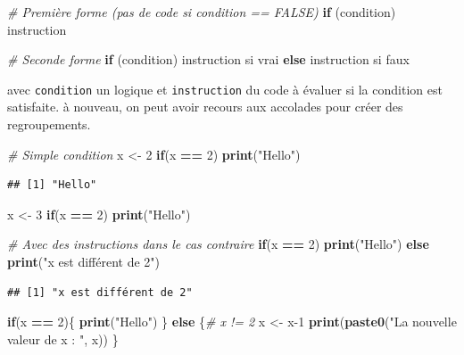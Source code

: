 \documentclass[
  11pt,
]{book}
\newenvironment{Shaded}{\begin{snugshade}}{\end{snugshade}}
\newcommand{\CommentTok}[1]{\textcolor[rgb]{0.56,0.35,0.01}{\textit{#1}}}
\newcommand{\ControlFlowTok}[1]{\textcolor[rgb]{0.13,0.29,0.53}{\textbf{#1}}}
\newcommand{\DecValTok}[1]{\textcolor[rgb]{0.00,0.00,0.81}{#1}}
\newcommand{\KeywordTok}[1]{\textcolor[rgb]{0.13,0.29,0.53}{\textbf{#1}}}
\newcommand{\NormalTok}[1]{#1}
\newcommand{\OperatorTok}[1]{\textcolor[rgb]{0.81,0.36,0.00}{\textbf{#1}}}
\newcommand{\StringTok}[1]{\textcolor[rgb]{0.31,0.60,0.02}{#1}}
\numberwithin{equation}{section}
\numberwithin{countremarque}{section}
\begin{document}
\begin{Shaded}
\begin{Highlighting}[]
\CommentTok{\# Première forme (pas de code si condition == FALSE)}
\ControlFlowTok{if}\NormalTok{ (condition) instruction}

\CommentTok{\# Seconde forme}
\ControlFlowTok{if}\NormalTok{ (condition) instruction si vrai }\ControlFlowTok{else}\NormalTok{ instruction si faux}
\end{Highlighting}
\end{Shaded}

avec \texttt{condition} un logique et \texttt{instruction} du code à évaluer si la condition est satisfaite. à nouveau, on peut avoir recours aux accolades pour créer des regroupements.

\begin{Shaded}
\begin{Highlighting}[]
\CommentTok{\# Simple condition}
\NormalTok{x \textless{}{-}}\StringTok{ }\DecValTok{2}
\ControlFlowTok{if}\NormalTok{(x }\OperatorTok{==}\StringTok{ }\DecValTok{2}\NormalTok{) }\KeywordTok{print}\NormalTok{(}\StringTok{"Hello"}\NormalTok{)}
\end{Highlighting}
\end{Shaded}

\begin{lstlisting}
## [1] "Hello"
\end{lstlisting}

\begin{Shaded}
\begin{Highlighting}[]
\NormalTok{x \textless{}{-}}\StringTok{ }\DecValTok{3}
\ControlFlowTok{if}\NormalTok{(x }\OperatorTok{==}\StringTok{ }\DecValTok{2}\NormalTok{) }\KeywordTok{print}\NormalTok{(}\StringTok{"Hello"}\NormalTok{)}

\CommentTok{\# Avec des instructions dans le cas contraire}
\ControlFlowTok{if}\NormalTok{(x }\OperatorTok{==}\StringTok{ }\DecValTok{2}\NormalTok{) }\KeywordTok{print}\NormalTok{(}\StringTok{"Hello"}\NormalTok{) }\ControlFlowTok{else} \KeywordTok{print}\NormalTok{(}\StringTok{"x est différent de 2"}\NormalTok{)}
\end{Highlighting}
\end{Shaded}

\begin{lstlisting}
## [1] "x est différent de 2"
\end{lstlisting}

\begin{Shaded}
\begin{Highlighting}[]
\ControlFlowTok{if}\NormalTok{(x }\OperatorTok{==}\StringTok{ }\DecValTok{2}\NormalTok{)\{}
  \KeywordTok{print}\NormalTok{(}\StringTok{"Hello"}\NormalTok{)}
\NormalTok{\} }\ControlFlowTok{else}\NormalTok{ \{}\CommentTok{\# x != 2}
\NormalTok{  x \textless{}{-}}\StringTok{ }\NormalTok{x}\DecValTok{{-}1}
  \KeywordTok{print}\NormalTok{(}\KeywordTok{paste0}\NormalTok{(}\StringTok{"La nouvelle valeur de x : "}\NormalTok{, x))}
\NormalTok{\}}
\end{Highlighting}
\end{Shaded}
\end{document}
